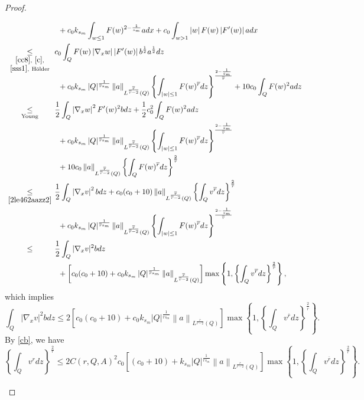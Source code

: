 \documentclass[11pt, a4paper]{article}
\numberwithin{equation}{section}
\newcommand{\coex}[2][\hphantom{longexplanation}]{%
  \underset{{#1}}{\overset{\hphantom{longexplanation}}{#2}}
}
\newcommand{\abs}[1]{\left\lvert #1\right\rvert}
\newcommand{\norm}[1]{\left\lVert #1\right\rVert}
\begin{document}
\begin{proof}
\begin{description}[wide]
\begin{align*}
\begin{split}
    &\coex{~}\quad + 
      c_{0}k_{s_{m}}\int_{w\le 1} F(w)^{2-\frac{1}{s_{m}}}a dx +
      c_{0}\int_{w> 1} \abs{w}F(w)\abs{F'(w)} a dx\\
    &\coex[\substack{\eqref{cc8},~\eqref{c},\\\eqref{sss1},~\text{H\"{o}lder}}]{\le}
    c_{0}\int_{Q} F(w)\abs{\nabla_{x} w}\abs{F'(w)}
    b^{\frac{1}{2}}a^{\frac{1}{2}} dz\\[-1em]
    &\coex{~}\quad +
      c_{0}k_{s_{m}}\abs{Q}^{\frac{1}{\overline{r}s_{m}}}\norm{a}_{L^{\frac{\overline{r}}{\overline{r}-2}}(Q)}\left\{\int_{\abs{w}\le
      1}F(w)^{\overline{r}}
      dz\right\}^{\frac{2-\frac{1}{s_{m}}}{\overline{r}}}+10c_{0}  \int_{Q}
      F(w)^{2} a dz\\
    &\coex[\text{Young}]{\le}
      \frac{1}{2} \int_{Q}\abs{\nabla_{x}
      w}^{2}F'(w)^{2}bdz+\frac{1}{2}c_{0}^{2} \int_{Q}F(w)^{2}adz\\
    &\coex{~}\quad
      +c_{0}k_{s_{m}}\abs{Q}^{\frac{1}{\overline{r}s_{m}}}\norm{a}_{L^{\frac{\overline{r}}{\overline{r}-2}}(Q)}\left\{\int_{\abs{w}\le
      1}F(w)^{\overline{r}}
      dz\right\}^{\frac{2-\frac{1}{s_{m}}}{\overline{r}}} \\
    &\coex{~}\quad+
      10c_{0}\norm{a}_{L^{\frac{\overline{r}}{\overline{r}-2}}(Q)}\left\{\int_{Q}F(w)^{\overline{r}}
      dz\right\}^{\frac{2}{\overline{r}}}\\
    &\coex[\eqref{2le462aazz2}]{\le}
      \frac{1}{2} \int_{Q}\abs{\nabla_{x}v}^{2}bdz +c_{0}(c_{0}+10)\norm{a}_{L^{\frac{\overline{r}}{\overline{r}-2}}(Q)}\left\{\int_{Q}v^{\overline{r}}dz\right\}^{\frac{2}{\overline{r}}}\\
    &\coex{~}\quad +
      c_{0}k_{s_{m}}\abs{Q}^{\frac{1}{\overline{r}s_{m}}}\norm{a}_{L^{\frac{\overline{r}}{\overline{r}-2}}(Q)}\left\{\int_{\abs{w}\le
      1}F(w)^{\overline{r}}
      dz\right\}^{\frac{2-\frac{1}{s_{m}}}{\overline{r}}}\\
    &\coex{\le}
      \frac{1}{2} \int_{Q} |\nabla_{x} v|^{2}bdz \\
    &\coex{~}\quad +
      \left[c_{0}(c_{0}+10) +c_{0}k_{s_{m}}\abs{Q}^{\frac{1}{\overline{r}s_{m}}}\norm{a}_{L^{\frac{\overline{r}}{\overline{r}-2}}(Q)} \right]\max\left\{1,\left\{\int_{Q}v^{\overline{r}}dz\right\}^{\frac{2}{\overline{r}}}\right\},
  \end{split}
\end{align*}
which implies
\[
  \int_{Q}\abs{\nabla_{x} v}^{2} bdz \le 2\left[c_{0}(c_{0}+10)+c_{0}k_{s_{m}}\abs{Q}^{\frac{1}{\overline{r}s_{m}}}\norm{a}_{L^{\frac{\overline{r}}{\overline{r}-2}}(Q)} \right]\max\left\{1,\left\{\int_{Q}v^{\overline{r}}dz\right\}^{\frac{2}{\overline{r}}}\right\}.
  \]
 By \eqref{cb}, we have
\[   \left\{\int_{Q}v^{r} dz\right\}^{\frac{2}{r}}\le
  2C(r,Q,A)^{2}c_{0}
  \left[(c_{0}+10)+k_{s_{m}}\abs{Q}^{\frac{1}{\overline{r}s_{m}}}\norm{a}_{L^{\frac{\overline{r}}{\overline{r}-2}}(Q)}
  \right]\max\left\{1,\left\{\int_{Q}v^{\overline{r}}dz\right\}^{\frac{2}{\overline{r}}}\right\}. \]


\end{description}
\end{proof}
\end{document}
